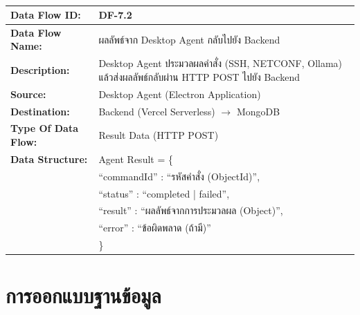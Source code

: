 \begin{table}[H]
    \caption{}
    \label{tab:df-7-2}
    \fontSixTeen 
    \begin{tabularx}{\textwidth}{|l|L|} 
        \hline
        \textbf{Data Flow ID:} & DF-7.2 \\
        \hline
        \textbf{Data Flow Name:} & ผลลัพธ์จาก Desktop Agent กลับไปยัง Backend \\
        \hline
        \textbf{Description:} & Desktop Agent ประมวลผลคำสั่ง (SSH, NETCONF, Ollama) แล้วส่งผลลัพธ์กลับผ่าน HTTP POST ไปยัง Backend \\
        \hline
        \textbf{Source:} & Desktop Agent (Electron Application) \\
        \hline
        \textbf{Destination:} & Backend (Vercel Serverless) $\rightarrow$ MongoDB \\
        \hline
        \textbf{Type Of Data Flow:} & Result Data (HTTP POST) \\
        \hline
        \textbf{Data Structure:} & Agent Result = \{ \nonumber \\
                        & \hspace{1em} ``commandId'' : ``รหัสคำสั่ง (ObjectId)'', \nonumber \\
                        & \hspace{1em} ``status'' : ``completed | failed'', \nonumber \\
                        & \hspace{1em} ``result'' : ``ผลลัพธ์จากการประมวลผล (Object)'', \nonumber \\
                        & \hspace{1em} ``error'' : ``ข้อผิดพลาด (ถ้ามี)'' \nonumber \\
                        & \} \\
        \hline
    \end{tabularx}
\end{table}


\section{การออกแบบฐานข้อมูล}

